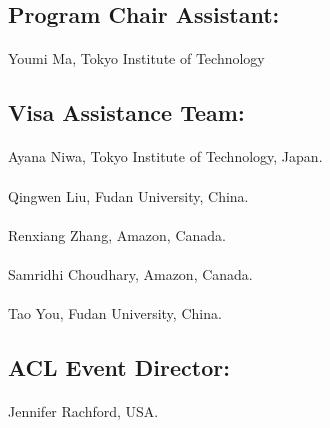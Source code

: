 \subsection*{Program Chair Assistant:}
\paragraph{} Youmi Ma, Tokyo Institute of Technology

\subsection*{Visa Assistance Team:}
\paragraph{} Ayana Niwa, Tokyo Institute of Technology, Japan.
\paragraph{} Qingwen Liu, Fudan University, China.
\paragraph{} Renxiang Zhang, Amazon, Canada.
\paragraph{} Samridhi Choudhary, Amazon, Canada.
\paragraph{} Tao You, Fudan University, China.
\subsection*{ACL Event Director:}
\paragraph{} Jennifer Rachford, USA.
